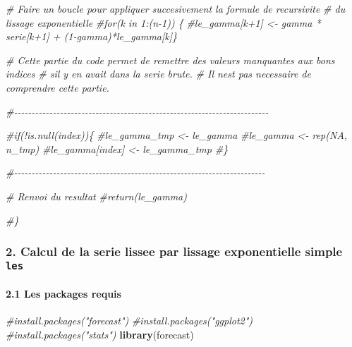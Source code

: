 \documentclass[
]{article}
\newenvironment{Shaded}{\begin{snugshade}}{\end{snugshade}}
\newcommand{\CommentTok}[1]{\textcolor[rgb]{0.56,0.35,0.01}{\textit{#1}}}
\newcommand{\FunctionTok}[1]{\textcolor[rgb]{0.13,0.29,0.53}{\textbf{#1}}}
\newcommand{\NormalTok}[1]{#1}
\begin{document}
\begin{Shaded}
\begin{Highlighting}[]
\CommentTok{\# Faire un boucle pour appliquer succesivement la formule de recursivite }
\CommentTok{\# du lissage exponentielle }
\CommentTok{\#for(k in 1:(n{-}1)) \{}
  \CommentTok{\#le\_gamma[k+1] \textless{}{-} gamma * serie[k+1] + (1{-}gamma)*le\_gamma[k]\}}
  

\CommentTok{\# Cette partie du code permet de remettre des valeurs manquantes aux bons indices }
\CommentTok{\# s\textquotesingle{}il y en avait dans la serie brute.}
\CommentTok{\# Il n\textquotesingle{}est pas necessaire de comprendre cette partie. }

\CommentTok{\#{-}{-}{-}{-}{-}{-}{-}{-}{-}{-}{-}{-}{-}{-}{-}{-}{-}{-}{-}{-}{-}{-}{-}{-}{-}{-}{-}{-}{-}{-}{-}{-}{-}{-}{-}{-}{-}{-}{-}{-}{-}{-}{-}{-}{-}{-}{-}{-}{-}{-}{-}{-}{-}{-}{-}{-}{-}{-}{-}{-}{-}{-}{-}{-}{-}{-}{-}{-}{-}{-}{-}{-}}

\CommentTok{\#if(!is.null(index))\{}
  \CommentTok{\#le\_gamma\_tmp \textless{}{-} le\_gamma}
  \CommentTok{\#le\_gamma \textless{}{-} rep(NA, n\_tmp)}
  \CommentTok{\#le\_gamma[index] \textless{}{-} le\_gamma\_tmp}
\CommentTok{\#\}}

\CommentTok{\#{-}{-}{-}{-}{-}{-}{-}{-}{-}{-}{-}{-}{-}{-}{-}{-}{-}{-}{-}{-}{-}{-}{-}{-}{-}{-}{-}{-}{-}{-}{-}{-}{-}{-}{-}{-}{-}{-}{-}{-}{-}{-}{-}{-}{-}{-}{-}{-}{-}{-}{-}{-}{-}{-}{-}{-}{-}{-}{-}{-}{-}{-}{-}{-}{-}{-}{-}{-}{-}{-}{-}}
  
\CommentTok{\# Renvoi du resultat}
\CommentTok{\#return(le\_gamma)}

\CommentTok{\#\}}
\end{Highlighting}
\end{Shaded}

\subsubsection{\texorpdfstring{2. Calcul de la serie lissee par lissage
exponentielle simple
\texttt{les}}{2. Calcul de la serie lissee par lissage exponentielle simple les}}\label{calcul-de-la-serie-lissee-par-lissage-exponentielle-simple-les}

\paragraph{2.1 Les packages requis}\label{les-packages-requis}

\begin{Shaded}
\begin{Highlighting}[]
\CommentTok{\#install.packages("forecast")}
\CommentTok{\#install.packages("ggplot2")}
\CommentTok{\#install.packages("stats")}
\FunctionTok{library}\NormalTok{(forecast)}
\end{Highlighting}
\end{Shaded}
\end{document}
